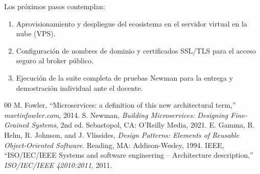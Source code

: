 \documentclass[conference]{IEEEtran}
\begin{document}
Los próximos pasos contemplan:
\begin{enumerate}
    \item Aprovisionamiento y despliegue del ecosistema en el servidor virtual en la nube (VPS).
    \item Configuración de nombres de dominio y certificados SSL/TLS para el acceso seguro al broker público.
    \item Ejecución de la suite completa de pruebas Newman para la entrega y demostración individual ante el docente.
\end{enumerate}

\begin{thebibliography}{00}
 M. Fowler, ``Microservices: a definition of this new architectural term,'' \textit{martinfowler.com}, 2014.
 S. Newman, \textit{Building Microservices: Designing Fine-Grained Systems}, 2nd ed. Sebastopol, CA: O'Reilly Media, 2021.
 E. Gamma, R. Helm, R. Johnson, and J. Vlissides, \textit{Design Patterns: Elements of Reusable Object-Oriented Software}. Reading, MA: Addison-Wesley, 1994.
 IEEE, ``ISO/IEC/IEEE Systems and software engineering -- Architecture description,'' \textit{ISO/IEC/IEEE 42010:2011}, 2011.
\end{thebibliography}
\end{document}
